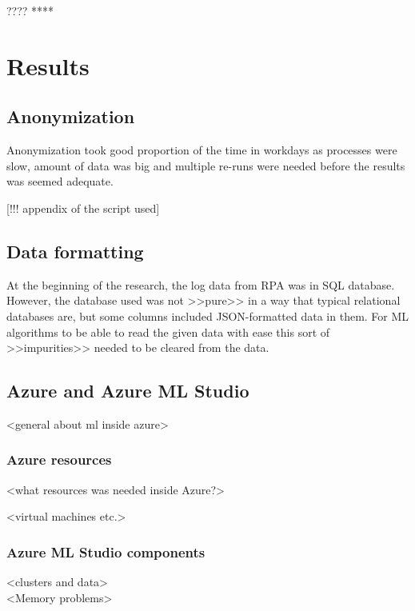 \documentclass[english, 12pt, a4paper, elec, utf8, a-1b, online]{aaltothesis}
\begin{document}
???? **** \\


\clearpage




\section{Results}

\subsection{Anonymization}
Anonymization took good proportion of the time in workdays
as processes were slow,
amount of data was big
and multiple re-runs were needed
before the results was seemed adequate.

[!!! appendix of the script used]

\subsection{Data formatting}
At the beginning of the research,
the log data from RPA was in SQL database.
However,
the database used was not >>pure>>
in a way that typical relational databases are,
but some columns included JSON-formatted data in them.
For ML algorithms to be able to read the given data with ease
this sort of >>impurities>> needed to be cleared from the data.


\subsection{Azure and Azure ML Studio}

<general about ml inside azure>

\subsubsection*{Azure resources}

<what resources was needed inside Azure?>

<virtual machines etc.>




\subsubsection*{Azure ML Studio components}
<clusters and data>
\\

<Memory problems>
\\
\end{document}
